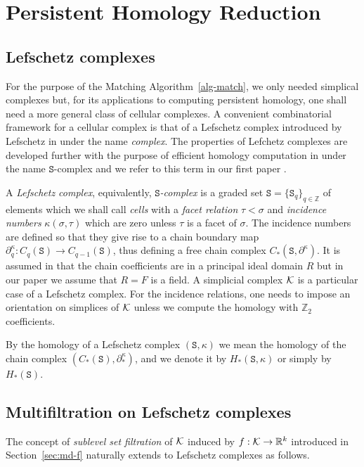\documentclass[12pt]{article}
\newcommand{\R}{{\mathbb R}}
\newcommand{\Z}{{\mathbb Z}}
\newcommand{\cK}{{\cal K}}
\newcommand{\bdy}{{\partial}} \newcommand{\cbdy}{bd\,} \newcommand{\sbdy}{\mbox{\rm bd\,}} \newcommand{\cb}{\mbox{\rm \bf cb\,}} \newcommand{\sd}{\mbox{\rm sd\,}}
\newcommand{\sS}{\texttt{S}} \newcommand{\sA}{\texttt{A}}
\begin{document}
\section{Persistent Homology Reduction}
\label{per-hom}

\subsection{Lefschetz complexes}

For the purpose of the Matching Algorithm~\ref{alg-match}, we only needed simplical complexes but, for its applications to computing persistent homology, one shall need a more general class of cellular complexes. A convenient combinatorial framework for a cellular complex is that of a Lefschetz complex introduced by Lefschetz in \cite{Lef42} under the name {\em complex}. The properties of Lefchetz complexes are developed further with the purpose of efficient homology computation in \cite{MrBa09} under the name $\sS$-complex and we refer to this term in our first paper \cite{AlKaLa17}.

A {\em  Lefschetz complex}, equivalently, {\em $\sS$-complex} is a graded set $\sS=\{\sS_q\}_{q\in\Z}$ of elements which we shall call {\em cells} with a {\em facet relation} $\tau < \sigma$ and {\em incidence numbers} $\kappa(\sigma, \tau)$ which are zero unless $\tau$ is a facet of $\sigma$. The incidence numbers are defined so that they give rise to a chain boundary map $\bdy^\kappa_q:C_q(\sS) \to C_{q-1}(\sS)$, thus defining a free chain complex $C_*(\sS, \bdy^\kappa)$. It is assumed in \cite{MrBa09} that the chain coefficients are in a principal ideal domain $R$ but in our paper we assume that $R=F$ is a field. A simplicial complex $\cK$ is a particular case of a Lefschetz complex. For the incidence relations, one needs to impose an orientation on simplices of $\cK$ unless we compute the homology with $\Z_2$ coefficients.

By the homology of a Lefschetz complex $(\sS, \kappa)$ we mean the homology of the chain complex $(C_*(\sS),\partial^\kappa_* )$, and we denote it by $H_*(\sS, \kappa)$ or simply by $H_*(\sS)$.

\subsection{Multifiltration on Lefschetz complexes}\label{sec:S-m-filt}

The concept of {\em sublevel set filtration} of $\cK$ induced by $f: \cK \to \R^k$ introduced in Section~\ref{sec:md-f} naturally extends to Lefschetz complexes as follows.
\end{document}
